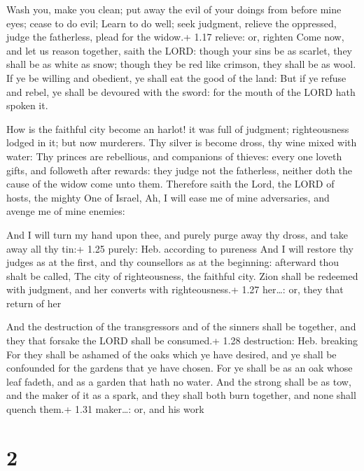  Wash you, make you clean; put away the evil of your
doings from before mine eyes; cease to do evil;  Learn to
do well; seek judgment, relieve the oppressed, judge the fatherless,
plead for the widow.+ 1.17 relieve: or, righten  Come now,
and let us reason together, saith the LORD: though your sins be as
scarlet, they shall be as white as snow; though they be red like
crimson, they shall be as wool.  If ye be willing and
obedient, ye shall eat the good of the land:  But if ye
refuse and rebel, ye shall be devoured with the sword: for the mouth of
the LORD hath spoken it.

 How is the faithful city become an harlot! it was full
of judgment; righteousness lodged in it; but now murderers.
 Thy silver is become dross, thy wine mixed with water:
 Thy princes are rebellious, and companions of thieves:
every one loveth gifts, and followeth after rewards: they judge not the
fatherless, neither doth the cause of the widow come unto them.
 Therefore saith the Lord, the LORD of hosts, the mighty
One of Israel, Ah, I will ease me of mine adversaries, and avenge me of
mine enemies:

 And I will turn my hand upon thee, and purely purge away
thy dross, and take away all thy tin:+ 1.25 purely: Heb. according to
pureness  And I will restore thy judges as at the first,
and thy counsellors as at the beginning: afterward thou shalt be called,
The city of righteousness, the faithful city.  Zion shall
be redeemed with judgment, and her converts with righteousness.+ 1.27
her\ldots: or, they that return of her

 And the destruction of the transgressors and of the
sinners shall be together, and they that forsake the LORD shall be
consumed.+ 1.28 destruction: Heb. breaking  For they shall
be ashamed of the oaks which ye have desired, and ye shall be confounded
for the gardens that ye have chosen.  For ye shall be as an
oak whose leaf fadeth, and as a garden that hath no water. 
And the strong shall be as tow, and the maker of it as a spark, and they
shall both burn together, and none shall quench them.+ 1.31 maker\ldots:
or, and his work

\hypertarget{section-1}{%
\section{2}\label{section-1}}

